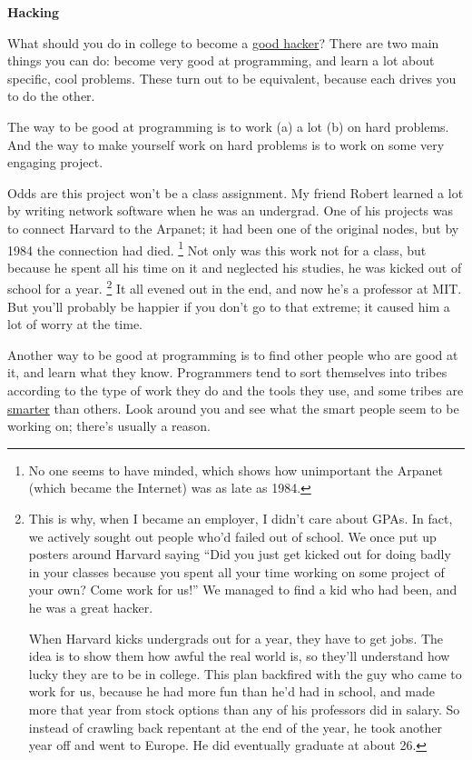 \documentclass[12pt]{book}
\begin{document}
\textbf{Hacking}

What should you do in college to become a \href{gh.html}{good hacker}?
There are two main things you can do: become very good at programming,
and learn a lot about specific, cool problems. These turn out to be
equivalent, because each drives you to do the other.

The way to be good at programming is to work (a) a lot (b) on hard
problems. And the way to make yourself work on hard problems is to work
on some very engaging project.

Odds are this project won't be a class assignment. My friend Robert
learned a lot by writing network software when he was an undergrad. One
of his projects was to connect Harvard to the Arpanet; it had been one
of the original nodes, but by 1984 the connection had died. \footnote{No one seems to have minded, which shows how unimportant the
Arpanet (which became the Internet) was as late as 1984.} Not
only was this work not for a class, but because he spent all his time on
it and neglected his studies, he was kicked out of school for a year.
\footnote{This is why, when I became an employer, I didn't care about
GPAs. In fact, we actively sought out people who'd failed out of school.
We once put up posters around Harvard saying ``Did you just get kicked
out for doing badly in your classes because you spent all your time
working on some project of your own? Come work for us!'' We managed to
find a kid who had been, and he was a great hacker.

When Harvard kicks undergrads out for a year, they have to get jobs. The
idea is to show them how awful the real world is, so they'll understand
how lucky they are to be in college. This plan backfired with the guy
who came to work for us, because he had more fun than he'd had in
school, and made more that year from stock options than any of his
professors did in salary. So instead of crawling back repentant at the
end of the year, he took another year off and went to Europe. He did
eventually graduate at about 26.} It all evened out in the end, and now he's a professor at MIT.
But you'll probably be happier if you don't go to that extreme; it
caused him a lot of worry at the time.

Another way to be good at programming is to find other people who are
good at it, and learn what they know. Programmers tend to sort
themselves into tribes according to the type of work they do and the
tools they use, and some tribes are \href{pypar.html}{smarter} than
others. Look around you and see what the smart people seem to be working
on; there's usually a reason.
\end{document}
